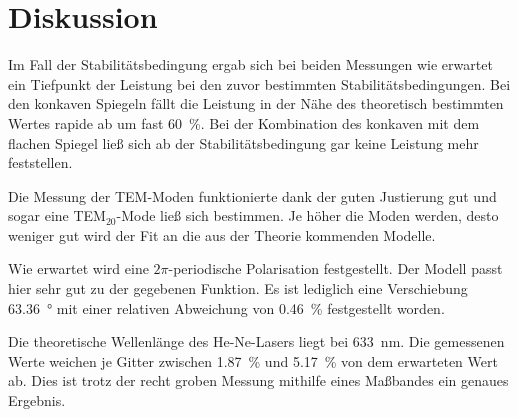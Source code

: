 \section{Diskussion}
\label{sec:Diskussion}

Im Fall der Stabilitätsbedingung ergab sich bei beiden Messungen wie erwartet ein Tiefpunkt der Leistung bei den zuvor bestimmten Stabilitätsbedingungen. 
Bei den konkaven Spiegeln fällt die Leistung in der Nähe des theoretisch bestimmten Wertes rapide ab um fast \SI{60}{\percent}.
Bei der Kombination des konkaven mit dem flachen Spiegel ließ sich ab der Stabilitätsbedingung gar keine Leistung mehr feststellen. 

Die Messung der TEM-Moden funktionierte dank der guten Justierung gut und sogar eine TEM$_{20}$-Mode ließ sich bestimmen. 
Je höher die Moden werden, desto weniger gut wird der Fit an die aus der Theorie kommenden Modelle.

Wie erwartet wird eine $2\pi$-periodische Polarisation festgestellt. Der Modell passt hier sehr gut zu der gegebenen Funktion. 
Es ist lediglich eine Verschiebung \SI{63.36}{\degree} mit einer relativen Abweichung von \SI{0.46}{\percent} festgestellt worden. 

Die theoretische Wellenlänge des He-Ne-Lasers liegt bei \SI{633}{\nano\meter}. Die gemessenen Werte weichen je Gitter zwischen \SI{1.87}{\percent} und \SI{5.17}{\percent} von dem erwarteten Wert ab. Dies ist trotz der recht groben Messung mithilfe eines Maßbandes ein genaues Ergebnis. 